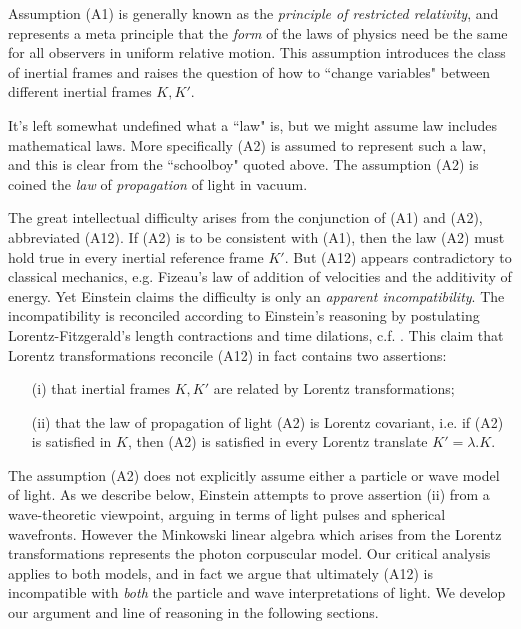 \documentclass[12pt]{amsart}
\begin{document}
Assumption (A1) is generally known as the \emph{principle of restricted relativity}, and represents a meta principle that the \emph{form} of the laws of physics need be the same for all observers in uniform relative motion. This assumption introduces the class of inertial frames and raises the question of how to ``change variables" between different inertial frames $K, K'$.

It's left somewhat undefined what a ``law" is, but we might assume law includes mathematical laws. More specifically (A2) is assumed to represent such a law, and this is clear from the ``schoolboy" quoted above. The assumption (A2) is coined the \emph{law} of \emph{propagation} of light in vacuum. 

The great intellectual difficulty arises from the conjunction of (A1) and (A2), abbreviated (A12). If (A2) is to be consistent with (A1), then the law (A2) must hold true in every inertial reference frame $K'$. But (A12) appears contradictory to classical mechanics, e.g. Fizeau's law of addition of velocities and the additivity of energy. Yet Einstein claims the difficulty is only an \emph{apparent incompatibility}. The incompatibility is reconciled according to Einstein's reasoning by postulating Lorentz-Fitzgerald's length contractions and time dilations, c.f. \cite[Ch.XIV]{michelson}. This claim that Lorentz transformations reconcile (A12) in fact contains two assertions: 

\begin{itemize}
\item[(i)] that inertial frames $K, K'$ are related by Lorentz transformations; 

\item[(ii)] that the law of propagation of light (A2) is Lorentz covariant, i.e. if (A2) is satisfied in $K$, then (A2) is satisfied in every Lorentz translate $K'=\lambda.K$.
\end{itemize}

The assumption (A2) does not explicitly assume either a particle or wave model of light. As we describe below, Einstein attempts to prove assertion (ii) from a wave-theoretic viewpoint, arguing in terms of light pulses and spherical wavefronts. However the Minkowski linear algebra which arises from the Lorentz transformations represents the photon corpuscular model. Our critical analysis applies to both models, and in fact we argue that ultimately (A12) is incompatible with \emph{both} the particle and wave interpretations of light. We develop our argument and line of reasoning in the following sections.  
\end{document}

